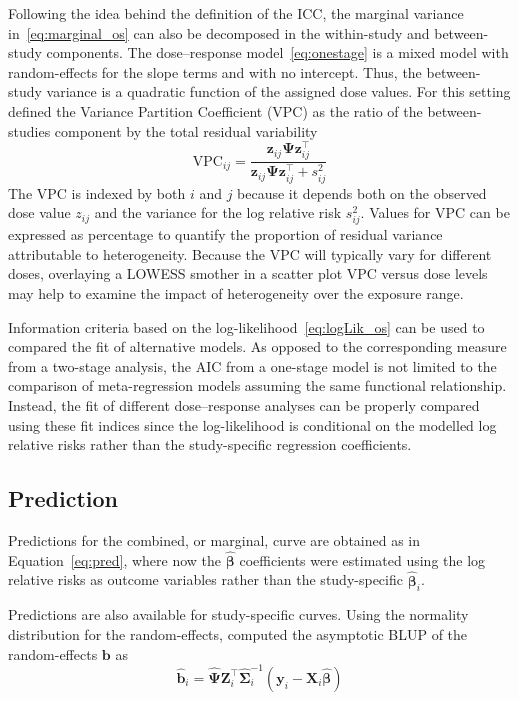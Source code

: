 \documentclass[11pt,a4paper,twoside,openany]{book}\usepackage{knitr}
\begin{document}
{{\noindent Following the idea behind the definition of the ICC, the marginal variance in~\ref{eq:marginal_os} can also be decomposed in the within-study and between-study components. The dose--response model~\ref{eq:onestage} is a mixed model with random-effects for the slope terms and with no intercept. Thus, the between-study variance is a quadratic function of the assigned dose values. For this setting \cite{goldstein2002partitioning} defined the Variance Partition Coefficient (VPC) as the ratio of the between-studies component by the total residual variability
\begin{equation}
\textrm{VPC}_{ij} = \frac{\mathbf{z}_{ij} \boldsymbol{\Psi} \mathbf{z}_{ij}^\top}{\mathbf{z}_{ij} \boldsymbol{\Psi} \mathbf{z}_{ij}^\top  + s_{ij}^2}
\label{eq:vpc}
\end{equation}
\noindent The VPC is indexed by both $i$ and $j$ because it depends both on the observed dose value $z_{ij}$ and the variance for the log relative risk $s_{ij}^2$. Values for VPC can be expressed as percentage to quantify the proportion of residual variance attributable to heterogeneity. Because the VPC will typically vary for different doses, overlaying a LOWESS smother in a scatter plot VPC versus dose levels may help to examine the impact of heterogeneity over the exposure range.

Information criteria based on the log-likelihood~\ref{eq:logLik_os} can be used to compared the fit of alternative models. As opposed to the corresponding measure from a two-stage analysis, the AIC from a one-stage model is not limited to the comparison of meta-regression models assuming the same functional relationship. Instead, the fit of different dose--response analyses can be properly compared using these fit indices since the log-likelihood is conditional on the modelled log relative risks rather than the study-specific regression coefficients. 



\subsection{Prediction}

Predictions for the combined, or marginal, curve are obtained as in Equation~\ref{eq:pred}, where now the $\boldsymbol{\hat \beta}$ coefficients were estimated using the log relative risks as outcome variables rather than the study-specific $\boldsymbol{\hat \beta}_i$. 

\noindent Predictions are also available for study-specific curves. Using the normality distribution for the random-effects, \cite{henderson1959estimation} computed the asymptotic BLUP of the random-effects $\boldsymbol{b}$ as
\begin{equation}
\hat {\mathbf{b}}_i = \hat{\boldsymbol{\Psi}} \mathbf{Z}_i^\top \hat{\boldsymbol{\Sigma}}_i^{-1}\left( \mathbf{y}_i - \mathbf{X}_i\hat{\boldsymbol{\beta}} \right)
\label{eq:blup_os}
\end{equation}

}}
\end{document}
